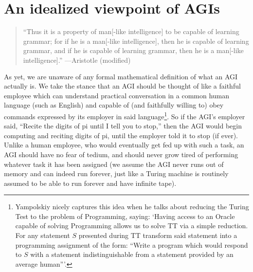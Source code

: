 \documentclass{article}
\begin{document}
\section{An idealized viewpoint of AGIs}
\label{agiperspectivesection}

\begin{quote}
    ``Thus it is a property of man[-like intelligence] to be capable of learning
    grammar; for if he is a man[-like intelligence], then he is capable of learning
    grammar, and if he is capable of learning grammar, then he is
    a man[-like intelligence].'' ---Aristotle \cite{aristotle} (modified)
\end{quote}

As yet, we are unaware of any formal mathematical definition of what an AGI
actually is. We take the stance that an AGI should be thought of like a faithful
employee which can understand
practical conversation in a common human language (such as
English) and capable of (and faithfully willing to) obey commands
expressed by its employer in said language\footnote{Yampolskiy \cite{yampolskiy2013turing}
nicely captures this idea when he talks about reducing the Turing Test to the
problem of Programming, saying: `Having access to an Oracle capable of solving Programming
allows us to solve TT via a simple reduction. For any statement $S$ presented during
TT transform said statement into a programming assignment of the form: ``Write a
program which would respond to $S$ with a statement indistinguishable from a statement
provided by an average human{''}'.}.
So if the AGI's employer said, ``Recite the digits of pi until I tell you to
stop,'' then the AGI would begin computing and reciting digits of pi, until the
employer told it to stop (if ever). Unlike a human employee, who would eventually
get fed up with such a task, an AGI should have no fear of tedium, and should
never grow tired of performing whatever task it has been assigned (we assume
the AGI never runs out of memory and can indeed run forever, just like a Turing
machine is routinely assumed to be able to run forever and have infinite tape).
\end{document}
